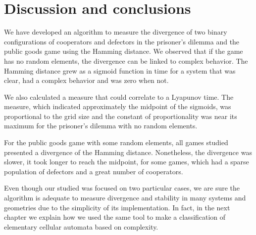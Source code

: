 \section{Discussion and conclusions}

We have developed an algorithm to measure the divergence of two binary configurations of cooperators and defectors in the prisoner's dilemma and the public goods game using the Hamming distance. We observed that if the game has no random elements, the divergence can be linked to complex behavior.
The Hamming distance grew as a sigmoid function in time for a system that was clear, had a complex behavior and was zero when not.
 
We also calculated a measure that could correlate to a Lyapunov time. The measure, which indicated approximately the midpoint of the sigmoids, was proportional to the grid size and the constant of proportionality was near its maximum for the prisoner's dilemma with no random elements.

For the public goods game with some random elements, all games studied presented a divergence of the Hamming distance. Nonetheless, the divergence was slower, it took longer to reach the midpoint, for some games, which had a sparse population of defectors and a great number of cooperators.

Even though our studied was focused on two particular cases, we are sure the algorithm is adequate to measure divergence and stability in many systems and geometries due to the simplicity of its implementation. In fact, in the next chapter we explain how we used the same tool to make a classification of elementary cellular automata based on complexity.

 




